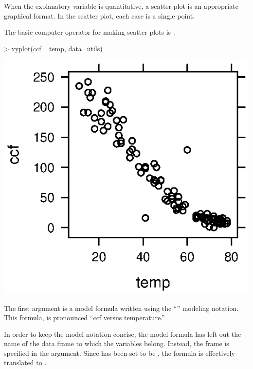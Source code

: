 When the explanatory variable is quantitative, a scatter-plot is an
appropriate graphical format.  In the scatter plot, each case is a
single point.

The basic computer operator for making scatter plots is :

\begin{Schunk}
\begin{Sinput}
> xyplot(ccf ~ temp, data=utils)
\end{Sinput}
\end{Schunk}
\includegraphics{Figures/language-utils-scatter}

The first argument is a model formula written using the
``\model{}{}'' modeling notation. This formula,
 is pronounced ``ccf versus temperature.''


In order to keep the model notation concise, the model formula has
left out the name of the data frame to which the variables belong.
Instead, the frame is specified in the  argument.  Since
 has been set to be , the formula 
 is effectively 
translated to . 


